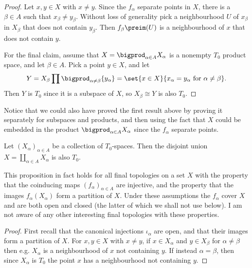 \documentclass[article, a4paper, 11pt, oneside]{memoir}
\numberwithin{equation}{chapter}
\begin{document}
\begin{proof}
    Let $x,y \in X$ with $x \neq y$. Since the $f_\alpha$ separate points in $X$, there is a $\beta \in A$ such that $x_\beta \neq y_\beta$. Without loss of generality pick a neighbourhood $U$ of $x_\beta$ in $X_\beta$ that does not contain $y_\beta$. Then $f_\beta\preim(U)$ is a neighbourhood of $x$ that does not contain $y$.

    For the final claim, assume that $X = \bigprod_{\alpha \in A} X_\alpha$ is a nonempty $T_0$ product space, and let $\beta \in A$. Pick a point $y \in X$, and let
    \begin{equation*}
        Y
            = X_\beta \prod \bigprod_{\alpha \neq \beta} \{y_\alpha\}
            = \set{x \in X}{x_\alpha = y_\alpha \text{ for } \alpha \neq \beta}.
    \end{equation*}
    Then $Y$ is $T_0$ since it is a subspace of $X$, so $X_\beta \cong Y$ is also $T_0$.
\end{proof}
%
Notice that we could also have proved the first result above by proving it separately for subspaces and products, and then using the fact that $X$ could be embedded in the product $\bigprod_{\alpha \in A} X_\alpha$ since the $f_\alpha$ separate points.


\begin{proposition}
    \label{thm:T0-disjoint-union}
    Let $(X_\alpha)_{\alpha \in A}$ be a collection of $T_0$-spaces. Then the disjoint union $X = \coprod_{\alpha \in A} X_\alpha$ is also $T_0$. %
\end{proposition}
%
This proposition in fact holds for all final topologies on a set $X$ with the property that the coinducing maps $(f_\alpha)_{\alpha \in A}$ are injective, and the property that the images $f_\alpha(X_\alpha)$ form a partition of $X$. Under these assumptions the $f_\alpha$ cover $X$ and are both open and closed (the latter of which we shall not use below). I am not aware of any other interesting final topologies with these properties.

\begin{proof}
    First recall that the canonical injections $\iota_\alpha$ are open, and that their images form a partition of $X$. For $x,y \in X$ with $x \neq y$, if $x \in X_\alpha$ and $y \in X_\beta$ for $\alpha \neq \beta$ then e.g. $X_\alpha$ is a neighbourhood of $x$ not containing $y$. If instead $\alpha = \beta$, then since $X_\alpha$ is $T_0$ the point $x$ has a neighbourhood not containing $y$.
\end{proof}
\end{document}
